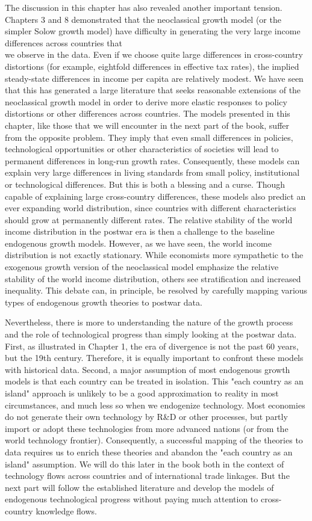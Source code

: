 \documentclass[\topdir/lecture\_notes.tex]{subfiles}
\begin{document}
The discussion in this chapter has also revealed another important tension. Chapters 3 and 8 demonstrated that the neoclassical growth model (or the simpler Solow growth model) have difficulty in generating the very large income differences across countries that\\
we observe in the data. Even if we choose quite large differences in cross-country distortions (for example, eightfold differences in effective tax rates), the implied steady-state differences in income per capita are relatively modest. We have seen that this has generated a large literature that seeks reasonable extensions of the neoclassical growth model in order to derive more elastic responses to policy distortions or other differences across countries. The models presented in this chapter, like those that we will encounter in the next part of the book, suffer from the opposite problem. They imply that even small differences in policies, technological opportunities or other characteristics of societies will lead to permanent differences in long-run growth rates. Consequently, these models can explain very large differences in living standards from small policy, institutional or technological differences. But this is both a blessing and a curse. Though capable of explaining large cross-country differences, these models also predict an ever expanding world distribution, since countries with different characteristics should grow at permanently different rates. The relative stability of the world income distribution in the postwar era is then a challenge to the baseline endogenous growth models. However, as we have seen, the world income distribution is not exactly stationary. While economists more sympathetic to the exogenous growth version of the neoclassical model emphasize the relative stability of the world income distribution, others see stratification and increased inequality. This debate can, in principle, be resolved by carefully mapping various types of endogenous growth theories to postwar data.

Nevertheless, there is more to understanding the nature of the growth process and the role of technological progress than simply looking at the postwar data. First, as illustrated in Chapter 1, the era of divergence is not the past 60 years, but the 19th century. Therefore, it is equally important to confront these models with historical data. Second, a major assumption of most endogenous growth models is that each country can be treated in isolation. This "each country as an island" approach is unlikely to be a good approximation to reality in most circumstances, and much less so when we endogenize technology. Most economies do not generate their own technology by R\&D or other processes, but partly import or adopt these technologies from more advanced nations (or from the world technology frontier). Consequently, a successful mapping of the theories to data requires us to enrich these theories and abandon the "each country as an island" assumption. We will do this later in the book both in the context of technology flows across countries and of international trade linkages. But the next part will follow the established literature and develop the models of endogenous technological progress without paying much attention to cross-country knowledge flows.
\end{document}
